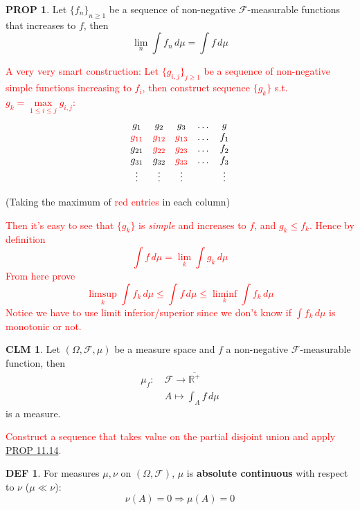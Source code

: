 \documentclass[hidelinks]{article}
\theoremstyle{definition}
\newtheorem*{defin}{DEF}
\theoremstyle{dotless}
\newtheorem{proposition}{PROP}[section]
\newtheorem{claim}{CLM}[section]
\theoremstyle{remark}
\begin{document}
\begin{proposition}\label{PROP 11.14}
Let $\{f_n\}_{n\geq1}$ be a sequence of non-negative $\mathscr{F}$-measurable functions that increases to $f$, then
\[\lim_n\int f_n\,d\mu=\int f\,d\mu\]
\end{proposition}
\textcolor{red}{A very very smart construction: Let $\{g_{i,j}\}_{j\geq1}$ be a sequence of non-negative simple functions increasing to $f_i$, then construct sequence $\{g_k\}$ s.t. $g_k=\max\limits_{1\leq i\leq j}g_{i,j}$:}
$$\begin{matrix}
g_1 & g_2 & g_3 & \dots & g\\
\textcolor{red}{g_{11}} & \textcolor{red}{g_{12}} & \textcolor{red}{g_{13}} & \dots & f_1\\
g_{21} & \textcolor{red}{g_{22}} & \textcolor{red}{g_{23}} & \dots & f_2\\
g_{31} & g_{32} & \textcolor{red}{g_{33}} & \dots & f_3\\
\vdots & \vdots & \vdots & & \vdots
\end{matrix}$$
\begin{center}
    (Taking the maximum of \textcolor{red}{red entries} in each column)
\end{center}
\textcolor{red}{Then it's easy to see that $\{g_k\}$ is \emph{simple} and increases to $f$, and $g_k\leq f_k$. Hence by definition
\[\int f\,d\mu=\lim_k\int g_k\,d\mu\]
From here prove
\[\limsup_k\int f_k\,d\mu\leq\int f\,d\mu\leq\liminf_k\int f_k\,d\mu\]
Notice we have to use limit inferior/superior since we don't know if $\int f_k\,d\mu$ is monotonic or not.}

\begin{claim}\label{CLM 11.30}
Let $(\Omega,\mathscr{F},\mu)$ be a measure space and $f$ a non-negative $\mathscr{F}$-measurable function, then
\begin{align*}
\mu_f:\ &\mathscr{F}\to\overline{\mathbb{R}^+}\\
&A\mapsto\int_Af\,d\mu
\end{align*}
is a measure.
\end{claim}
\textcolor{red}{Construct a sequence that takes value on the partial disjoint union and apply \hyperref[PROP 11.14]{PROP 11.14}.}

\begin{defin}
For measures $\mu,\nu$ on $(\Omega,\mathscr{F})$, $\mu$ is \textbf{absolute continuous} with respect to $\nu$ ($\mu\ll\nu$):
\[\nu(A)=0\Rightarrow\mu(A)=0\]
\end{defin}
\end{document}
